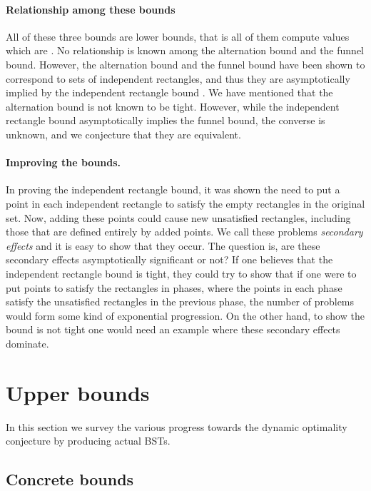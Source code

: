 \documentclass[11pt]{article}
\begin{document}
\paragraph{Relationship among these bounds}

All of these three bounds are lower bounds, that is all of them compute values which are .
No relationship is known among the alternation bound and the funnel bound. However, the alternation bound and the funnel bound have been shown to correspond to  sets of independent rectangles, and thus they are asymptotically implied by the independent rectangle bound \cite{DBLP:conf/soda/DemaineHIKP09}. We have mentioned that the alternation bound is not known to be tight. However, while the independent rectangle bound asymptotically implies the funnel bound, the converse is unknown, and we conjecture that they are equivalent.


\paragraph{Improving the bounds.}
In proving the independent rectangle bound, it was shown the need to put a point in each independent rectangle to satisfy the empty rectangles in the original set. Now, adding these points could cause new unsatisfied rectangles, including those that are defined entirely by added points. We call these problems \emph{secondary effects} and it is easy to show that they occur. The question is, are these secondary effects asymptotically significant or not? If one believes that the independent rectangle bound is tight, they could try to show that if one were to put points to satisfy the rectangles in phases, where the points in each phase satisfy the unsatisfied rectangles in the previous phase, the number of problems would form some kind of exponential progression. On the other hand, to show the bound is not tight one would 
need an example where these secondary effects dominate.



\section{Upper bounds}

In this section we survey the various progress towards the dynamic optimality conjecture by producing actual BSTs.


\subsection{Concrete bounds}
\end{document}

